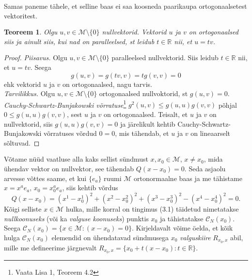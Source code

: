 \documentclass[a4paper,12pt]{article}
\newtheorem{teoreem}{Teoreem}[section]
\numberwithin{equation}{section}
\begin{document}
Samas paneme tähele, et selline baas ei saa koosneda paarikaupa ortogonaalsetest vektoritest.
\begin{teoreem}
Olgu $u, v \in \mathcal{M} \setminus \{0\}$ nullvektorid. Vektorid $u$ ja $v$ on ortogonaalsed siis ja ainult siis, kui nad on paralleelsed, st leidub $t \in \mathbb{R}$ nii, et $u = tv$.
\end{teoreem}
\begin{proof}
\emph{Piisavus.} Olgu $u, v \in \mathcal{M} \setminus \{0\}$ paralleelsed nullvektorid. Siis leidub $t \in \mathbb{R}$ nii, et $u = tv$. Seega
\[g\left(u, v\right) = g \left(tv, v\right) = t g \left(v, v\right) = 0\]
ehk vektorid $u$ ja $v$ on ortogonaalsed, nagu tarvis.
\\
\emph{Tarvilikkus.} Olgu $u, v \in \mathcal{M} \setminus \{0\}$ ortogonaalsed nullvoktorid, st $g \left(u, v\right) = 0$. \emph{Cauchy-Schwartz-Bunjakowski võrratuse}\footnote{Vaata Lisa 1, Teoreem 4.2} $g^2 \left(u, v \right) \leq g \left(u, u \right) g \left(v, v \right)$ põhjal $0 \leq g \left(u, u \right) g \left(v, v \right)$, sest $u$ ja $v$ on ortogonaalsed. Teisalt, et $u$ ja $v$ on nullvektorid, siis $g \left(u, u \right) g \left(v, v \right) = 0$ ja järelikult kehtib Cauchy-Schwartz-Bunjakowski võrratuses võrdud $0 = 0$, mis tähendab, et $u$ ja $v$ on lineaarselt sõltuvad.
\end{proof}

Võtame nüüd vaatluse alla kaks sellist sündmust $x, x_0 \in \mathcal{M}$, $x \neq x_0$, mida ühendav vektor on nullvektor, see tähendab $Q \left(x- x_0\right) = 0$. Seda asjaolu arvesse võttes saame, et kui $\{e_a\}$ ruumi $\mathcal{M}$ ortonormaalne baas ja me tähistame $x = x^a e_a$, $x_0 = x_0^a e_a$, siis kehtib võrdus
\begin{equation}
Q \left(x - x_0\right) = \left(x^1 - x_0^1\right)^2 + \left(x^2 - x_0^2\right)^2 + \left(x^3 - x_0^3\right)^2 - \left(x^4 - x_0^4\right)^2 = 0.
\end{equation}
Kõigi selliste $x \in \mathcal{M}$ hulka, mille korral on tingimus (3.1) täidetud nimetatakse \emph{nullkoonuseks} (või ka \emph{valguse koonuseks}) punktis $x_0$ ja tähistatakse $\mathcal{C}_N\left(x_0\right)$. Seega $\mathcal{C}_N\left(x_0\right) = \{x \in \mathcal{M} : \left(x- x_0\right) = 0 \}$. Kirjeldavalt võime öelda, et kõik hulga $\mathcal{C}_N\left(x_0\right)$ elemendid on ühendatavad sündmusega $x_0$ \emph{valguskiire} $R_{x_0, x}$ abil, mille me defineerime järgnevalt $R_{x_0, x} = \{x_0 + t\left(x - x_0\right) : t \in \mathbb{R} \}$.
\end{document}
